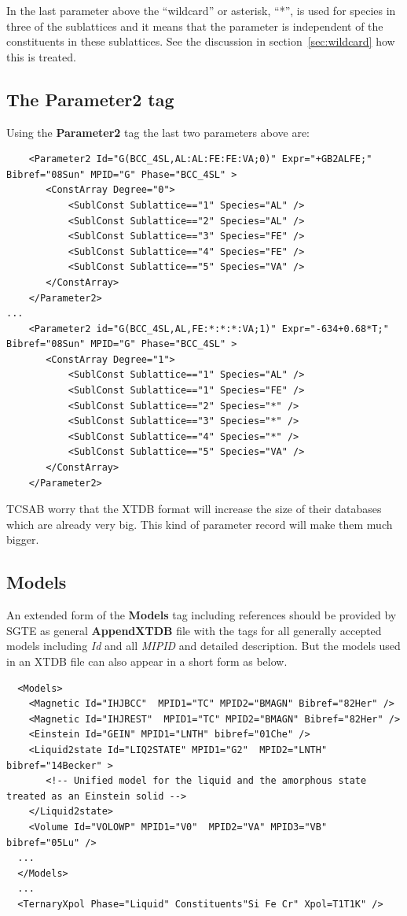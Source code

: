 \documentclass{article}
\begin{document}
\begin{appendices}
In the last parameter above the ``wildcard'' or asterisk, ``*'', is
used for species in three of the sublattices and it means that the
parameter is independent of the constituents in these sublattices.
See the discussion in section~\ref{sec:wildcard} how this is treated.


\subsection{The Parameter2 tag}

Using the {\bf Parameter2} tag the last two parameters above are:

{\small
\begin{verbatim}
    <Parameter2 Id="G(BCC_4SL,AL:AL:FE:FE:VA;0)" Expr="+GB2ALFE;" Bibref="08Sun" MPID="G" Phase="BCC_4SL" >
       <ConstArray Degree="0">
           <SublConst Sublattice=="1" Species="AL" />
           <SublConst Sublattice=="2" Species="AL" />
           <SublConst Sublattice=="3" Species="FE" />
           <SublConst Sublattice=="4" Species="FE" />
           <SublConst Sublattice=="5" Species="VA" />
       </ConstArray>
    </Parameter2>
...
    <Parameter2 id="G(BCC_4SL,AL,FE:*:*:*:VA;1)" Expr="-634+0.68*T;" Bibref="08Sun" MPID="G" Phase="BCC_4SL" >
       <ConstArray Degree="1">
           <SublConst Sublattice=="1" Species="AL" />
           <SublConst Sublattice=="1" Species="FE" />
           <SublConst Sublattice=="2" Species="*" />
           <SublConst Sublattice=="3" Species="*" />
           <SublConst Sublattice=="4" Species="*" />
           <SublConst Sublattice=="5" Species="VA" />
       </ConstArray>
    </Parameter2>
\end{verbatim}
}

TCSAB worry that the XTDB format will increase the size of their
databases which are already very big.  This kind of parameter record
will make them much bigger.

\subsection{Models}\label{sec:modelex}

An extended form of the {\bf Models} tag including references should
be provided by SGTE as general {\bf AppendXTDB} file with the tags
for all generally accepted models including {\em Id} and all {\em
  MIPID} and detailed description.  But the models used in an XTDB
file can also appear in a short form as below.

{\small
\begin{verbatim}
  <Models>
    <Magnetic Id="IHJBCC"  MPID1="TC" MPID2="BMAGN" Bibref="82Her" />
    <Magnetic Id="IHJREST"  MPID1="TC" MPID2="BMAGN" Bibref="82Her" />
    <Einstein Id="GEIN" MPID1="LNTH" bibref="01Che" /> 
    <Liquid2state Id="LIQ2STATE" MPID1="G2"  MPID2="LNTH" bibref="14Becker" >
       <!-- Unified model for the liquid and the amorphous state treated as an Einstein solid -->
    </Liquid2state>
    <Volume Id="VOLOWP" MPID1="V0"  MPID2="VA" MPID3="VB" bibref="05Lu" />
  ...
  </Models>
  ...
  <TernaryXpol Phase="Liquid" Constituents"Si Fe Cr" Xpol=T1T1K" />
\end{verbatim}
}


\end{appendices}
\end{document}
